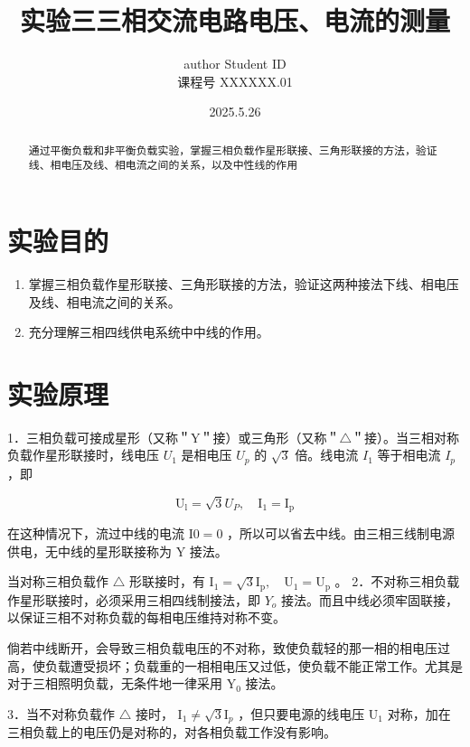 \documentclass{article}
\title{\heiti\zihao{2}实验三\quad 三相交流电路电压、电流的测量 }
\author{\songti  author  Student ID  \\
课程号  XXXXXX.01 }
\date{2025.5.26}
\begin{document}
    \maketitle
\begin{abstract}
    
    通过平衡负载和非平衡负载实验，掌握三相负载作星形联接、三角形联接的方法，验证线、相电压及线、相电流之间的关系，以及中性线的作用
    
\end{abstract}
\section{实验目的}
\begin{enumerate}
    \item 掌握三相负载作星形联接、三角形联接的方法，验证这两种接法下线、相电压及线、相电流之间的关系。 
    \item 充分理解三相四线供电系统中中线的作用。
\end{enumerate}

\section{实验原理}
1．三相负载可接成星形（又称＂Y＂接）或三角形（又称＂$\triangle$＂接）。当三相对称负载作星形联接时，线电压 $U_1$ 是相电压 $U_p$ 的 $\sqrt{3}$ 倍。线电流 $I_1$ 等于相电流 $I_p$ ，即

$$
\mathrm{U}_{\mathrm{l}}=\sqrt{3} U_P, \quad \mathrm{I}_1=\mathrm{I}_{\mathrm{p}}
$$


在这种情况下，流过中线的电流 $\mathrm{I} 0=0$ ，所以可以省去中线。由三相三线制电源供电，无中线的星形联接称为 Y 接法。

当对称三相负载作 $\triangle$ 形联接时，有 $\mathrm{I}_1=\sqrt{3} \mathrm{I}_{\mathrm{p}}, \quad \mathrm{U}_1=\mathrm{U}_{\mathrm{p}}$ 。
2．不对称三相负载作星形联接时，必须采用三相四线制接法，即 $Y_o$ 接法。而且中线必须牢固联接，以保证三相不对称负载的每相电压维持对称不变。

倘若中线断开，会导致三相负载电压的不对称，致使负载轻的那一相的相电压过高，使负载遭受损坏；负载重的一相相电压又过低，使负载不能正常工作。尤其是对于三相照明负载，无条件地一律采用 $\mathrm{Y}_0$ 接法。

3．当不对称负载作 $\triangle$ 接时， $\mathrm{I}_1 \neq \sqrt{3} \mathrm{I}_p$ ，但只要电源的线电压 $\mathrm{U}_1$ 对称，加在三相负载上的电压仍是对称的，对各相负载工作没有影响。
\end{document}
